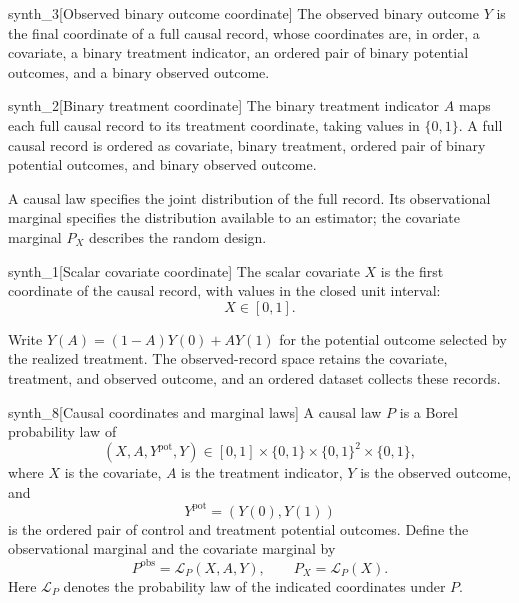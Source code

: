 \documentclass[11pt]{article}
\begin{document}
\begin{definitionv}{synth_3}[Observed binary outcome coordinate]
The observed binary outcome \(Y\) is the final coordinate of a full causal record, whose coordinates are, in order, a covariate, a binary treatment indicator, an ordered pair of binary potential outcomes, and a binary observed outcome.
\end{definitionv}

\begin{definitionv}{synth_2}[Binary treatment coordinate]
The binary treatment indicator \(A\) maps each full causal record to its treatment coordinate, taking values in \(\{0,1\}\). A full causal record is ordered as covariate, binary treatment, ordered pair of binary potential outcomes, and binary observed outcome.
\end{definitionv}

A causal law  specifies the joint distribution of the full record. Its observational marginal  specifies the distribution available to an estimator; the covariate marginal \(P_X\) describes the random design.

\begin{definitionv}{synth_1}[Scalar covariate coordinate]
The scalar covariate \(X\) is the first coordinate of the causal record, with values in the closed unit interval:
\[
X \in [0,1].
\]
\end{definitionv}

Write \(Y(A)=(1-A)Y(0)+AY(1)\) for the potential outcome selected by the realized treatment. The observed-record space  retains the covariate, treatment, and observed outcome, and an ordered dataset  collects these records.

\begin{definitionv}{synth_8}[Causal coordinates and marginal laws]
A causal law \(P\) is a Borel probability law of
\[
(X,A,Y^{\mathrm{pot}},Y)
\in[0,1]\times\{0,1\}\times\{0,1\}^2\times\{0,1\},
\]
where \(X\) is the covariate, \(A\) is the treatment indicator, \(Y\) is the observed outcome, and
\[
Y^{\mathrm{pot}}=(Y(0),Y(1))
\]
is the ordered pair of control and treatment potential outcomes. Define the observational marginal and the covariate marginal by
\[
P^{\mathrm{obs}}=\mathcal L_P(X,A,Y),
\qquad
P_X=\mathcal L_P(X).
\]
Here \(\mathcal L_P\) denotes the probability law of the indicated coordinates under \(P\).
\end{definitionv}
\end{document}
